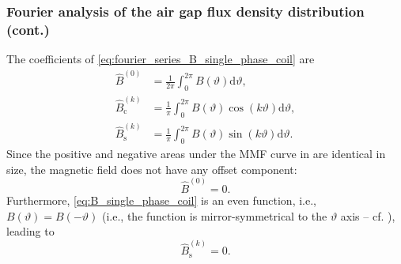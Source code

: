 \begin{frame}
	\frametitle{Fourier analysis of the air gap flux density distribution (cont.)}
        The coefficients of \eqref{eq:fourier_series_B_single_phase_coil} are
        \begin{equation}
            \begin{split}
                \hat{B}^{(0)} &= \frac{1}{2\pi} \int_{0}^{2\pi} B(\vartheta) \mathrm{d}\vartheta, \\
                \hat{B}_{\mathrm{c}}^{(k)} &= \frac{1}{\pi} \int_{0}^{2 \pi} B(\vartheta) \cos(k \vartheta) \mathrm{d}\vartheta, \\
                \hat{B}_{\mathrm{s}}^{(k)} &= \frac{1}{\pi} \int_{0}^{2\pi} B(\vartheta) \sin(k \vartheta) \mathrm{d}\vartheta.
            \end{split}
        \end{equation}
        \pause
       Since the positive and negative areas under the MMF curve in  are identical in size, the magnetic field does not have any offset component:
        $$\hat{B}^{(0)} = 0.$$ \pause Furthermore, \eqref{eq:B_single_phase_coil} is an even function, i.e., $B(\vartheta)=B(-\vartheta)$ (i.e., the function is mirror-symmetrical to the $\vartheta$ axis -- cf. ), leading to $$\hat{B}_{\mathrm{s}}^{(k)} = 0.$$
\end{frame}

